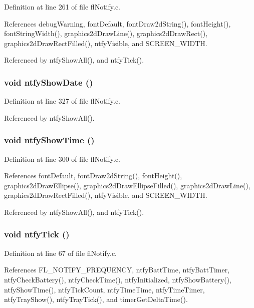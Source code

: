 Definition at line 261 of file fl\-Notify.c.

References debug\-Warning, font\-Default, font\-Draw2d\-String(), font\-Height(), font\-String\-Width(), graphics2d\-Draw\-Line(), graphics2d\-Draw\-Rect(), graphics2d\-Draw\-Rect\-Filled(), ntfy\-Visible, and SCREEN\_\-WIDTH.

Referenced by ntfy\-Show\-All(), and ntfy\-Tick().
\subsubsection{\setlength{\rightskip}{0pt plus 5cm}void ntfy\-Show\-Date ()}\label{flNotify_8c_d4ad320596b2f405aae8dffff7ee9f47}




Definition at line 327 of file fl\-Notify.c.

Referenced by ntfy\-Show\-All().
\subsubsection{\setlength{\rightskip}{0pt plus 5cm}void ntfy\-Show\-Time ()}\label{flNotify_8c_b820d2dca060b648b4c51bdc592c2d95}




Definition at line 300 of file fl\-Notify.c.

References font\-Default, font\-Draw2d\-String(), font\-Height(), graphics2d\-Draw\-Ellipse(), graphics2d\-Draw\-Ellipse\-Filled(), graphics2d\-Draw\-Line(), graphics2d\-Draw\-Rect\-Filled(), ntfy\-Visible, and SCREEN\_\-WIDTH.

Referenced by ntfy\-Show\-All(), and ntfy\-Tick().
\subsubsection{\setlength{\rightskip}{0pt plus 5cm}void ntfy\-Tick ()}\label{flNotify_8c_7aeb64804d2b67f5d68a9e737a8c929b}




Definition at line 67 of file fl\-Notify.c.

References FL\_\-NOTIFY\_\-FREQUENCY, ntfy\-Batt\-Time, ntfy\-Batt\-Timer, ntfy\-Check\-Battery(), ntfy\-Check\-Time(), ntfy\-Initialized, ntfy\-Show\-Battery(), ntfy\-Show\-Time(), ntfy\-Tick\-Count, ntfy\-Time\-Time, ntfy\-Time\-Timer, ntfy\-Tray\-Show(), ntfy\-Tray\-Tick(), and timer\-Get\-Delta\-Time().

